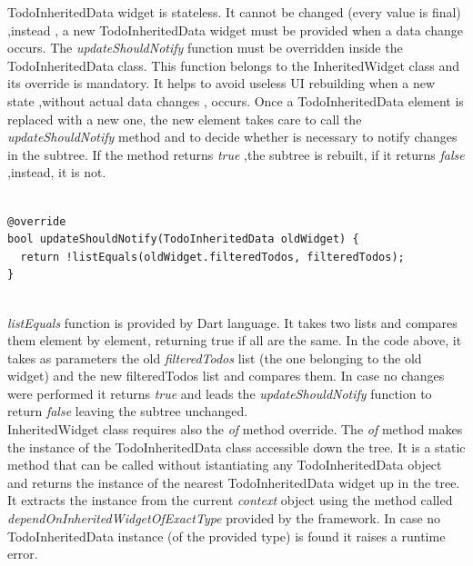 TodoInheritedData widget is stateless. It cannot be changed (every value is final) ,instead , a new TodoInheritedData widget must be provided when a data change occurs. 
The \textit{updateShouldNotify }function must be overridden inside the TodoInheritedData class. This function belongs to the InheritedWidget class and its override is mandatory. It helps to avoid useless UI rebuilding when a new state ,without actual data changes , occurs. Once a TodoInheritedData element is replaced with a new one, the new element takes care to call the \textit{updateShouldNotify }method and to decide whether is necessary to notify changes in the subtree. If the method returns \textit{true },the subtree is rebuilt, if  it returns \textit{false} ,instead, it is not.
\mbox{}\\
\begin{code}
 \mbox{}

\label{code:2.16}
\begin{verbatim}

@override
bool updateShouldNotify(TodoInheritedData oldWidget) {
  return !listEquals(oldWidget.filteredTodos, filteredTodos);
}
\end{verbatim}
\end{code}
\mbox{}\\

\textit{listEquals }function is provided by Dart language. It takes two lists and compares them element by element, returning true if all are the same. In the code above, it takes as parameters the old \textit{filteredTodos} list (the one belonging to the old widget)  and the new filteredTodos list and compares them. In case no changes were performed it returns \textit{true} and leads the \textit{updateShouldNotify }function to return \textit{false} leaving the subtree unchanged.\\


InheritedWidget class requires also the \textit{of} method override. The \textit{of }method makes the instance of the TodoInheritedData class accessible down the tree. It is a static method that can be called without istantiating any TodoInheritedData object and returns the instance of the nearest TodoInheritedData widget up in the tree. It extracts the instance from the current \textit{context} object using the method called \textit{dependOnInheritedWidgetOfExactType} provided by the framework. In case no TodoInheritedData instance (of the provided type) is found it raises a runtime error.

